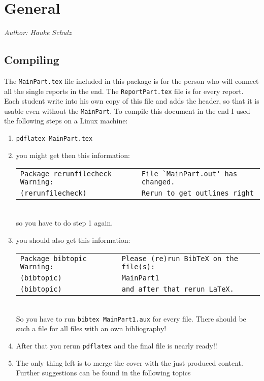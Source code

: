 \documentclass[12pt,a4paper,notitlepage]{scrreprt}
\begin{document}
\setcounter{tocdepth}{2}


\chapter{General}
\textit{Author: Hauke Schulz}
\section{Compiling}
The \verb#MainPart.tex# file included in this package is for the person who will connect all the single reports in the end. The \verb#ReportPart.tex# file is for every report. Each student write into his own copy of this file and adds the header, so that it is usable even without the \verb#MainPart#. To compile this document in the end I used the following steps on a Linux machine:
\begin{enumerate}
\item \verb#pdflatex MainPart.tex# 
\item you might get then this information:\\
\begin{tabular}{l l}
\verb#Package rerunfilecheck Warning:#&\verb#File `MainPart.out' has changed.#\\
\verb#(rerunfilecheck)#&\verb#Rerun to get outlines right#
\end{tabular}\\
so you have to do step 1 again.
\item you should also get this information:\\
\begin{tabular}{l l}
\verb#Package bibtopic Warning:#&\verb#Please (re)run BibTeX on the file(s):#\\
\verb#(bibtopic)#&\verb#MainPart1#\\
\verb#(bibtopic)#&\verb#and after that rerun LaTeX.#
\end{tabular}\\
So you have to run \verb#bibtex MainPart1.aux# for every file. There should be such a file for all files with an own bibliography!
\item After that you rerun \verb#pdflatex# and the final file is nearly ready!!
\item The only thing left is to merge the cover with the just produced content.
Further suggestions can be found in the following topics
\end{enumerate}
\end{document}
